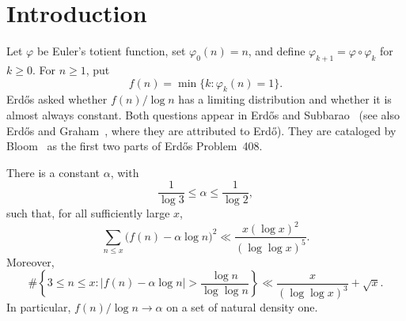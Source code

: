 \section{Introduction}

Let $\varphi$ be Euler's totient function, set $\varphi_0(n)=n$, and define $\varphi_{k+1}=\varphi\circ\varphi_k$ for $k\geq0$. For $n\geq1$, put
\[
 f(n)=\min\{k:\varphi_k(n)=1\}.
\]
Erd\H{o}s asked whether $f(n)/\log n$ has a limiting distribution and whether it is almost always constant. Both questions appear in Erd\H{o}s and Subbarao~\cite[p.~125]{ES72} (see also Erd\H{o}s and Graham~\cite[pp.~80--81]{EG80}, where they are attributed to Erd\H{o}). They are cataloged by Bloom~\cite{Bloom} as the first two parts of Erd\H{o}s Problem~408.

\begin{thm}\label{thm:main}
There is a constant $\alpha$, with
\[
 \frac1{\log 3}\leq\alpha\leq\frac1{\log 2},
\]
such that, for all sufficiently large $x$,
\begin{equation}\label{eq:variance}
 \sum_{n\leq x}\bigl(f(n)-\alpha\log n\bigr)^2
 \ll \frac{x(\log x)^2}{(\log\log x)^5}.
\end{equation}
Moreover,
\begin{equation}\label{eq:exceptional}
 \#\left\{3\leq n\leq x:
  |f(n)-\alpha\log n|>\frac{\log n}{\log\log n}\right\}
 \ll \frac{x}{(\log\log x)^3}+\sqrt{x}.
\end{equation}
In particular, $f(n)/\log n\to\alpha$ on a set of natural density one.
\end{thm}
